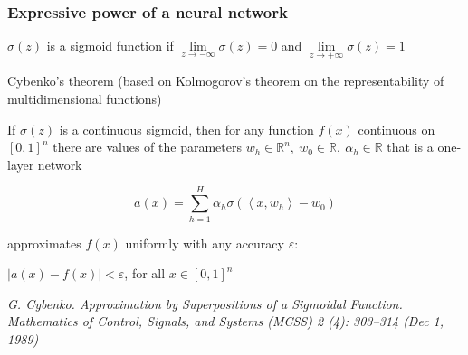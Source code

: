 \documentclass[fullscreen=true, bookmarks=true, hyperref={pdfencoding=unicode}]{beamer}
\begin{document}
\begin{frame}
  \frametitle{Expressive power of a neural network}

   $\sigma(z)$ is a sigmoid function if $\lim\limits_{z \to -\infty} \sigma(z) = 0$ and $\lim\limits_{z \to +\infty} \sigma( z) = 1$
   
   \begin{block}{Cybenko's theorem}
   (based on Kolmogorov's theorem on the representability of multidimensional functions)

   If $\sigma(z)$ is a continuous sigmoid, then for any function $f(x)$ continuous on $[0,1]^n$ there are values of the parameters $w_h \in \mathbb{R}^n,\ w_0 \in \mathbb{R},\ \alpha_h \in \mathbb{R}$ that is a one-layer network

   $$a(x) = \sum\limits_{h=1}^H \alpha_h \sigma(\left<x, w_h\right> - w_0)$$

   approximates $f(x)$ uniformly with any accuracy $\varepsilon$:

   $|a(x) - f(x)| < \varepsilon$, for all $x \in [0, 1]^n$
   \end{block}
  
  {\tiny \it G. Cybenko. Approximation by Superpositions of a Sigmoidal Function. Mathematics of Control, Signals, and Systems (MCSS) 2 (4): 303--314 (Dec 1, 1989)}
\end{frame}
\end{document}
